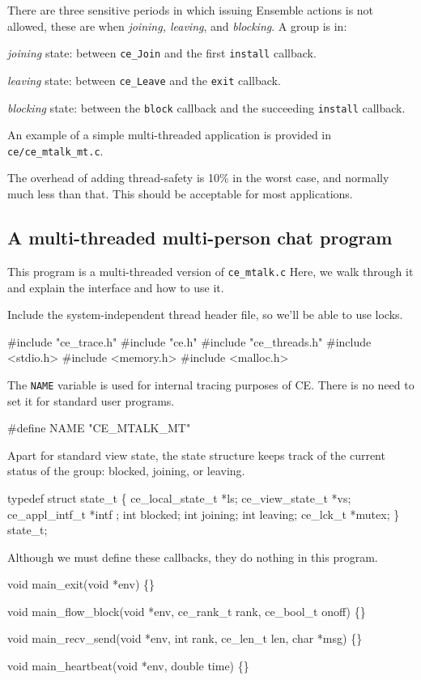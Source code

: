 There are three sensitive periods in which issuing Ensemble actions is
not allowed, these are when {\it joining, leaving}, and {\it
blocking}. A group is in:
\begin{description}
\item {\it joining} state: between {\tt ce\_Join} and
the first {\tt install} callback.
\item {\it leaving} state: between {\tt ce\_Leave} and the {\tt exit}
callback.
\item {\it blocking} state: between the {\tt block} callback and the
succeeding {\tt install} callback.
\end{description}

An example of a simple multi-threaded application is provided in {\tt
ce/ce\_mtalk\_mt.c}.

The overhead of adding thread-safety is 10\% in the worst case, and
normally much less than that. This should be acceptable for most 
applications. 

\subsection{A multi-threaded multi-person chat program}
This program is a multi-threaded version of {\tt ce\_mtalk.c}
Here, we walk through it and explain the interface and how to 
use it. 

Include the system-independent thread header file, so we'll be
able to use locks. 
\begin{codebox}
#include "ce_trace.h"
#include "ce.h"
#include "ce_threads.h"
#include <stdio.h>
#include <memory.h>
#include <malloc.h>
\end{codebox}


The {\tt NAME} variable is used for internal tracing purposes of
CE. There is no need to set it for standard user programs.
\begin{codebox}
#define NAME "CE_MTALK_MT"
\end{codebox}


Apart for standard view state, the state structure keeps track
of the current status of the group: blocked, joining, or leaving.
\begin{codebox}
typedef struct state_t \{
    ce_local_state_t *ls;
    ce_view_state_t *vs;
    ce_appl_intf_t *intf ;
    int blocked;
    int joining;
    int leaving;
    ce_lck_t *mutex;
\} state_t;
\end{codebox}

Although we must define these callbacks, they do nothing in this
program.
\begin{codebox}
void main_exit(void *env)
\{\}

void
main_flow_block(void *env, ce_rank_t rank, ce_bool_t onoff)
\{\}

void
main_recv_send(void *env, int rank, ce_len_t len, char *msg)
\{\}

void
main_heartbeat(void *env, double time)
\{\}
\end{codebox}




